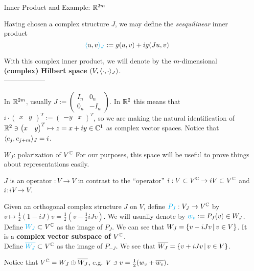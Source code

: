 \begin{frame}{Inner Product and Example: $\mathbb R^{2m}$} %
    
    Having chosen a complex structure $J$, we may define the \emph{sesquilinear} inner product \[ \textcolor{cyan}{\langle} u, v \textcolor{cyan}{\rangle_J} := g(u, v) + ig(Ju, v) \]
    
    With this complex inner product, we will denote by  the $m$-dimensional \textbf{(complex) Hilbert space} $(V, \langle \cdot, \cdot \rangle_J)$.\\------------------
    
    In $\mathbb R^{2m}$, usually 
    $J := \begin{pmatrix} 
        I_n & 0_n \\
        0_n & -I_n
    \end{pmatrix}$. In $\mathbb R^2$ this means that $i \cdot \begin{pmatrix} x & y \end{pmatrix}^T := \begin{pmatrix} -y & x\end{pmatrix}^T $, so we are making the natural identification of $\mathbb R^2 \ni \begin{pmatrix} x & y \end{pmatrix}^T \mapsto z = x + iy \in \mathbb C^1$ as complex vector spaces. Notice that $\langle e_j, e_{j+m} \rangle_J = i$.
    
    
    
\end{frame}

\begin{frame}{$W_J$: polarization of $V^\mathbb C$} %
    For our purposes, this space will be useful to prove things about representations easily.
    
    $J$ is an operator $:V \to V$ in contrast to the ``operator'' $i: V\subset V^\mathbb C \to iV \subset V^\mathbb C$ and $i:iV \to V$.
    
    \begin{definition}
    Given an orthogonal complex structure $J$ on $V$, define $\textcolor{cyan}{P_J}: V_J \to V^\mathbb C$ by $v \mapsto \frac{1}{2}(1 - iJ)v = \frac{1}{2}(v - \frac{1}{2}iJv)$. We will usually denote by $\textcolor{cyan}{w_v} := P_J(v) \in W_J$.\\
    Define $\textcolor{cyan}{W_J} \subset V^\mathbb C$ as the image of $P_J$. We can see that $W_J = \{v - iJv \,|\, v \in V\}$. It is a \textbf{complex vector subspace of $V^\mathbb C$}.\\
    Define $\textcolor{cyan}{\overline{W_J}} \subset V^\mathbb C$ as the image of $P_{-J}$. We see that $\overline{W_J} = \{v + iJv \,|\, v \in V\}$.
    \end{definition}
    
    Notice that $V^\mathbb C = W_J \oplus \overline{W_J}$, e.g. $V \ni v = \frac{1}{2}(w_v  + \overline{w_v})$.
    
\end{frame}

